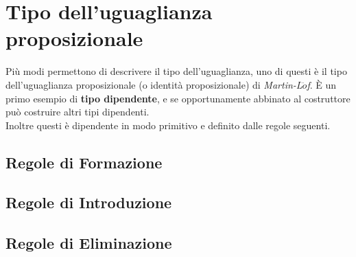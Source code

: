 \chapter{Tipo dell'uguaglianza proposizionale}
\label{cap: uguaglianza-proposizionale}
Pi\`u modi permettono di descrivere il tipo dell'uguaglianza, uno di questi \`e il tipo dell'uguaglianza proposizionale (o identit\`a proposizionale) di \textit{Martin-L$\ddot{o}$f}. \`E un primo esempio di \textbf{tipo dipendente}, e se opportunamente abbinato al costruttore pu\`o costruire altri tipi dipendenti.\\
\noindent
Inoltre questi \`e dipendente in modo primitivo e definito dalle regole seguenti.

\section{Regole di Formazione}
\label{subsec: formazione-id}
\begin{prooftree}
\end{prooftree}

\section{Regole di Introduzione}
\label{subsec: introduzione-id}
\begin{prooftree}
\end{prooftree}

\section{Regole di Eliminazione}
\label{subsec: eliminazione-id}
\small
\begin{prooftree}
\end{prooftree}

